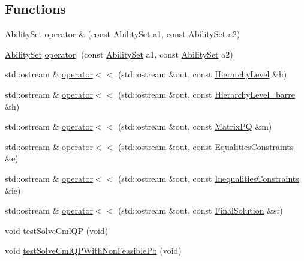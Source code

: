 \subsection*{Functions}
\begin{DoxyCompactItemize}
\item 
\hyperlink{classocra_1_1AbilitySet}{Ability\+Set} \hyperlink{namespaceocra_aeb699d061b8c3d896eb0c1ce0e789817}{operator \&} (const \hyperlink{classocra_1_1AbilitySet}{Ability\+Set} a1, const \hyperlink{classocra_1_1AbilitySet}{Ability\+Set} a2)
\item 
\hyperlink{classocra_1_1AbilitySet}{Ability\+Set} \hyperlink{namespaceocra_ade6062205230e055930cc06015904895}{operator$\vert$} (const \hyperlink{classocra_1_1AbilitySet}{Ability\+Set} a1, const \hyperlink{classocra_1_1AbilitySet}{Ability\+Set} a2)
\item 
std\+::ostream \& \hyperlink{namespaceocra_a1a3b81827cc00a5d60d7b291760a2c24}{operator$<$$<$} (std\+::ostream \&out, const \hyperlink{structocra_1_1HierarchyLevel}{Hierarchy\+Level} \&h)
\item 
std\+::ostream \& \hyperlink{namespaceocra_a32e98e3aa2f08382b40856002969589e}{operator$<$$<$} (std\+::ostream \&out, const \hyperlink{structocra_1_1HierarchyLevel__barre}{Hierarchy\+Level\+\_\+barre} \&h)
\item 
std\+::ostream \& \hyperlink{namespaceocra_a8e1107e277e275155b0762fd2ab2fc98}{operator$<$$<$} (std\+::ostream \&out, const \hyperlink{structocra_1_1MatrixPQ}{Matrix\+PQ} \&m)
\item 
std\+::ostream \& \hyperlink{namespaceocra_ace0d689942bcbdba20f3b51269fe5b01}{operator$<$$<$} (std\+::ostream \&out, const \hyperlink{structocra_1_1EqualitiesConstraints}{Equalities\+Constraints} \&e)
\item 
std\+::ostream \& \hyperlink{namespaceocra_ab9f8bd4031efb0e66f55ecd7ddda5801}{operator$<$$<$} (std\+::ostream \&out, const \hyperlink{structocra_1_1InequalitiesConstraints}{Inequalities\+Constraints} \&ie)
\item 
std\+::ostream \& \hyperlink{namespaceocra_a26b4974314516fab1d057c935783e24b}{operator$<$$<$} (std\+::ostream \&out, const \hyperlink{structocra_1_1FinalSolution}{Final\+Solution} \&sf)
\item 
void \hyperlink{namespaceocra_a1622744f4ef36df9f5b67eab7c19078a}{test\+Solve\+Cml\+QP} (void)
\item 
void \hyperlink{namespaceocra_ac7bf5fa708df93404630542f6d1f0b34}{test\+Solve\+Cml\+Q\+P\+With\+Non\+Feasible\+Pb} (void)
\item 

\end{DoxyCompactItemize}
